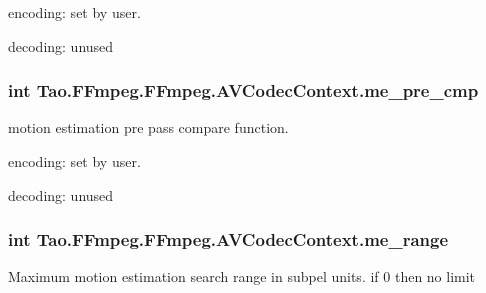 \begin{DoxyItemize}
\item encoding: set by user.
\item decoding: unused 
\end{DoxyItemize}\hypertarget{struct_tao_1_1_f_fmpeg_1_1_f_fmpeg_1_1_a_v_codec_context_afa8de5c689ce15f46869b701fab12db9}{
\subsubsection[{me\_\-pre\_\-cmp}]{\setlength{\rightskip}{0pt plus 5cm}int {\bf Tao.FFmpeg.FFmpeg.AVCodecContext.me\_\-pre\_\-cmp}}}
\label{struct_tao_1_1_f_fmpeg_1_1_f_fmpeg_1_1_a_v_codec_context_afa8de5c689ce15f46869b701fab12db9}
motion estimation pre pass compare function.
\begin{DoxyItemize}
\item encoding: set by user.
\item decoding: unused 
\end{DoxyItemize}\hypertarget{struct_tao_1_1_f_fmpeg_1_1_f_fmpeg_1_1_a_v_codec_context_abbc0e7f348a79c49d840a744284e855b}{
\subsubsection[{me\_\-range}]{\setlength{\rightskip}{0pt plus 5cm}int {\bf Tao.FFmpeg.FFmpeg.AVCodecContext.me\_\-range}}}
\label{struct_tao_1_1_f_fmpeg_1_1_f_fmpeg_1_1_a_v_codec_context_abbc0e7f348a79c49d840a744284e855b}
Maximum motion estimation search range in subpel units. if 0 then no limit


